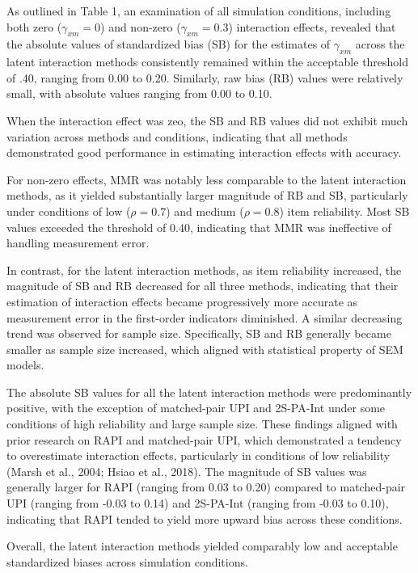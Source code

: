 \documentclass[
  man]{apa6}
\begin{document}
As outlined in Table 1, an examination of all simulation conditions, including both zero (\(\gamma_{xm} = 0\)) and non-zero (\(\gamma_{xm} = 0.3\)) interaction effects, revealed that the absolute values of standardized bias (SB) for the estimates of \(\gamma_{xm}\) across the latent interaction methods consistently remained within the acceptable threshold of .40, ranging from 0.00 to 0.20. Similarly, raw bias (RB) values were relatively small, with absolute values ranging from 0.00 to 0.10.

When the interaction effect was zeo, the SB and RB values did not exhibit much variation across methods and conditions, indicating that all methods demonstrated good performance in estimating interaction effects with accuracy.

For non-zero effects, MMR was notably less comparable to the latent interaction methods, as it yielded substantially larger magnitude of RB and SB, particularly under conditions of low (\(\rho = 0.7\)) and medium (\(\rho = 0.8\)) item reliability. Most SB values exceeded the threshold of 0.40, indicating that MMR was ineffective of handling measurement error.

In contrast, for the latent interaction methods, as item reliability increased, the magnitude of SB and RB decreased for all three methods, indicating that their estimation of interaction effects became progressively more accurate as measurement error in the first-order indicators diminished. A similar decreasing trend was observed for sample size. Specifically, SB and RB generally became smaller as sample size increased, which aligned with statistical property of SEM models.

The absolute SB values for all the latent interaction methods were predominantly positive, with the exception of matched-pair UPI and 2S-PA-Int under some conditions of high reliability and large sample size. These findings aligned with prior research on RAPI and matched-pair UPI, which demonstrated a tendency to overestimate interaction effects, particularly in conditions of low reliability (Marsh et al., 2004; Hsiao et al., 2018). The magnitude of SB values was generally larger for RAPI (ranging from 0.03 to 0.20) compared to matched-pair UPI (ranging from -0.03 to 0.14) and 2S-PA-Int (ranging from -0.03 to 0.10), indicating that RAPI tended to yield more upward bias across these conditions.

Overall, the latent interaction methods yielded comparably low and acceptable standardized biases across simulation conditions.
\end{document}
